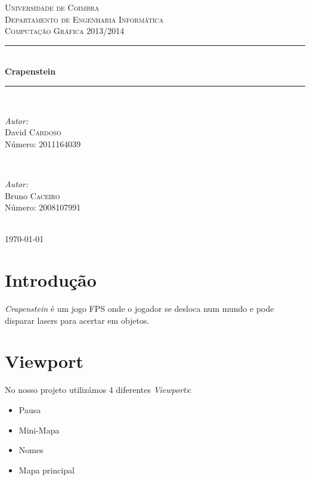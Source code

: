 \documentclass[12pt]{article}
\begin{document}
\renewcommand*\contentsname{Índice}

\begin{titlepage}

\newcommand{\HRule}{\rule{\linewidth}{0.5mm}} 
\center 
 

\textsc{\LARGE Universidade de Coimbra}\\[1.5cm] %
\textsc{\Large Departamento de Engenharia Informática}\\[4cm] %
\textsc{\large Computação Gráfica 2013/2014}\\[1cm] %


\HRule \\[0.5cm]
{ \huge \bfseries Crapenstein}\\[0.4cm] 
\HRule \\[8cm]
 
\begin{minipage}{0.4\textwidth}
\begin{flushleft} \large
\emph{Autor:}\\
David \textsc{Cardoso}  \\Número: 2011164039
\end{flushleft}
\end{minipage}
~
\begin{minipage}{0.4\textwidth}

\begin{flushright} \large
\emph{Autor:} \\
Bruno \textsc{Caceiro}  \\Número: 2008107991
\end{flushright}
\end{minipage}\\[2cm]

{\large \today}\\[3cm]

\vfill

\end{titlepage}





\section{Introdução}
\emph{Crapenstein} é um jogo FPS onde o jogador se desloca num mundo e pode disparar lasers para acertar em objetos.


\section{Viewport}
No nosso projeto utilizámos 4 diferentes \emph{Viewports}:
\begin{itemize}
	\item Pausa
	\item Mini-Mapa
	\item Nomes
	\item Mapa principal
\end{itemize}
\end{document}
